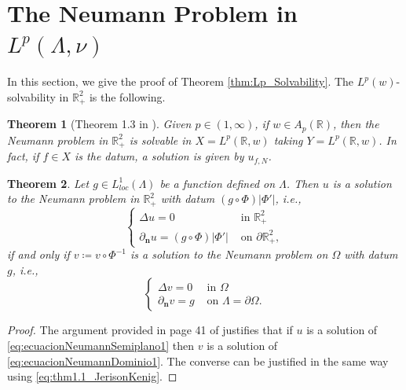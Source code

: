 \documentclass[12pt]{amsart}
\newcommand{\R}{\mathbb{R}}
\theoremstyle{plain}
\newtheorem{theorem}{Theorem}[section]
\theoremstyle{definition}
\numberwithin{equation}{section}
\begin{document}
\section{The Neumann Problem in \texorpdfstring{$L^p(\Lambda, \nu)$}{}}




In this section, we give the proof of Theorem \ref{thm:Lp_Solvability}.  The $L^p(w)$-solvability in $\R_{+}^{2}$ is the following.

\begin{theorem}[Theorem 1.3 in \cite{CNO}]\label{thm:thm1.3_CNO}
    Given $p\in (1,\infty)$, if $w \in A_p(\mathbb{R})$, then the Neumann problem in $\mathbb{R}_{+}^2$ is solvable in $X=L^p(\mathbb{R}, w)$ taking $Y=L^p(\mathbb{R}, w)$. In fact, if $f\in X$ is the datum, a solution is given by $u_{f,N}$.
\end{theorem}



\begin{theorem}\label{thm:page41_CNO}
    Let $g\in L_{loc}^{1}(\Lambda)$ be a function defined on $\Lambda$. Then $u$ is a solution to the Neumann problem in $\R_{+}^{2}$ with datum $(g\circ\Phi)|\Phi'|$, i.e.,
    \begin{equation}\label{eq:ecuacionNeumannSemiplano1}
    \begin{cases}
        \Delta u=0 & \text{ in }\R_{+}^{2}\\
        \partial_{\mathbf{n}}u=(g\circ\Phi)|\Phi'| & \text{ on } \partial\R_{+}^{2},
    \end{cases}    
    \end{equation}
    if and only if $v\coloneqq v\circ\Phi^{-1}$ is a solution to the Neumann problem on $\Omega$ with datum $g$, i.e., 
    \begin{equation}\label{eq:ecuacionNeumannDominio1}
    \begin{cases}
        \Delta v=0 & \text{ in } \Omega\\
        \partial_{\mathbf{n}}v=g & \text{ on } \Lambda=\partial\Omega.
    \end{cases}
    \end{equation}
\end{theorem}



\begin{proof}
    The argument provided in page 41 of \cite{CNO} justifies that if $u$ is a solution of \eqref{eq:ecuacionNeumannSemiplano1} then $v$ is a solution of \eqref{eq:ecuacionNeumannDominio1}. The converse can be justified in the same way using \eqref{eq:thm1.1_JerisonKenig}.
\end{proof}
\end{document}
